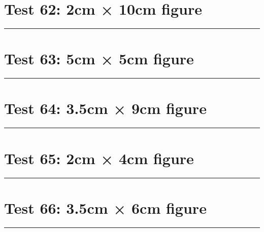 \documentclass[a4paper,11pt]{article}
\begin{document}
\section*{Test 62: 2cm × 10cm figure}
\begin{swarmwrap}%
  \begin{minipage}[t]{2cm}
    \centering
    \rule{\linewidth}{10cm}
  \end{minipage}%
\end{swarmwrap}%
\swarmwrapnext
\lipsum[25]
\lipsum[26]
\lipsum[27]
\section*{Test 63: 5cm × 5cm figure}
\begin{swarmwrap}%
  \begin{minipage}[t]{5cm}
    \centering
    \rule{\linewidth}{5cm}
  \end{minipage}%
\end{swarmwrap}%
\swarmwrapnext
\lipsum[106]
\lipsum[107]
\lipsum[108]
\lipsum[109]
\section*{Test 64: 3.5cm × 9cm figure}
\begin{swarmwrap}%
  \begin{minipage}[t]{3cm}
    \centering
    \rule{\linewidth}{9cm}
  \end{minipage}%
\end{swarmwrap}%
\swarmwrapnext
\lipsum[104]
\lipsum[105]
\lipsum[106]
\lipsum[107]
\section*{Test 65: 2cm × 4cm figure}
\begin{swarmwrap}%
  \begin{minipage}[t]{2cm}
    \centering
    \rule{\linewidth}{4cm}
  \end{minipage}%
\end{swarmwrap}%
\swarmwrapnext
\lipsum[2]
\lipsum[3]
\lipsum[4]
\lipsum[5]
\lipsum[6]
\lipsum[7]
\section*{Test 66: 3.5cm × 6cm figure}
\begin{swarmwrap}%
  \begin{minipage}[t]{3cm}
    \centering
    \rule{\linewidth}{6cm}
  \end{minipage}%
\end{swarmwrap}%
\swarmwrapnext
\lipsum[75]
\lipsum[76]
\lipsum[77]
\lipsum[78]
\lipsum[79]
\lipsum[80]
\end{document}
